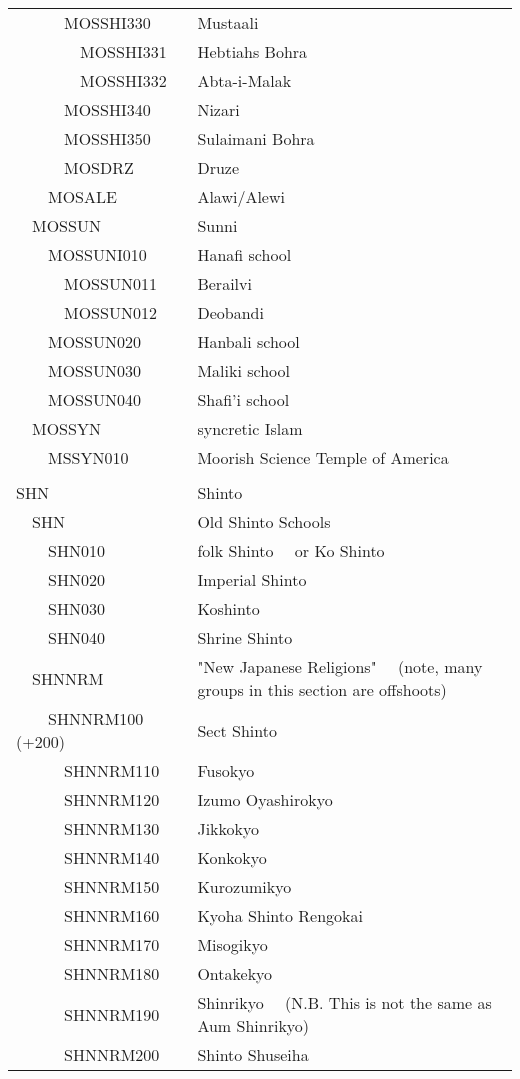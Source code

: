\documentclass[12pt]{article}
\begin{document}
\begin{tiny}
\begin{center}
\begin{longtable}{|l|l|}
~~~~~~MOSSHI330 & Mustaali \\
~~~~~~~~MOSSHI331 & Hebtiahs Bohra \\
~~~~~~~~MOSSHI332 & Abta-i-Malak \\
~~~~~~MOSSHI340 & Nizari \\
~~~~~~MOSSHI350 & Sulaimani Bohra \\
~~~~~~MOSDRZ & Druze \\
~~~~MOSALE & Alawi/Alewi \\
~~MOSSUN & Sunni \\
~~~~MOSSUNI010 & Hanafi school \\
~~~~~~MOSSUN011 & Berailvi \\
~~~~~~MOSSUN012 & Deobandi \\
~~~~MOSSUN020 & Hanbali school \\
~~~~MOSSUN030 & Maliki school \\
~~~~MOSSUN040 & Shafi'i school \\
~~MOSSYN & syncretic Islam \\
~~~~MSSYN010 & Moorish Science Temple of America \\
 \\
{\normalsize SHN } & {\normalsize Shinto } \\
~~SHN & Old Shinto Schools \\
~~~~SHN010 & folk Shinto	~~or Ko Shinto \\
~~~~SHN020 & Imperial Shinto \\
~~~~SHN030 & Koshinto \\
~~~~SHN040 & Shrine Shinto \\
~~SHNNRM & "New Japanese Religions"	~~(note, many groups in this section are offshoots) \\
~~~~SHNNRM100 (+200) & Sect Shinto \\
~~~~~~SHNNRM110 & Fusokyo \\
~~~~~~SHNNRM120 & Izumo Oyashirokyo \\
~~~~~~SHNNRM130 & Jikkokyo \\
~~~~~~SHNNRM140 & Konkokyo \\
~~~~~~SHNNRM150 & Kurozumikyo \\
~~~~~~SHNNRM160 & Kyoha Shinto Rengokai \\
~~~~~~SHNNRM170 & Misogikyo \\
~~~~~~SHNNRM180 & Ontakekyo \\
~~~~~~SHNNRM190 & Shinrikyo	~~(N.B. This is not the same as Aum Shinrikyo) \\
~~~~~~SHNNRM200 & Shinto Shuseiha \\

\end{longtable}
\end{center}
\end{tiny}
\end{document}
